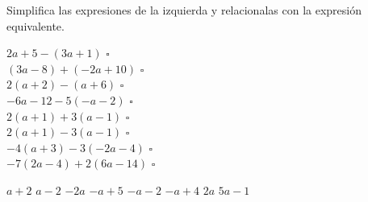 Simplifica las expresiones de la izquierda y relacionalas con la expresión equivalente.
\begin{multicols}{2}
    \begin{flushright}
        $2a+5 - (3a+1)$ $\square$\\       \vspace{0.5cm}
        $(3a-8)+(-2a+10)$ $\square$\\       \vspace{0.5cm}
        $2(a+2)-(a+6)$ $\square$\\       \vspace{0.5cm}
        $-6a-12-5(-a-2)$ $\square$\\       \vspace{0.5cm}
        $2(a+1)+3(a-1)$ $\square$\\       \vspace{0.5cm}
        $2(a+1)-3(a-1)$ $\square$\\       \vspace{0.5cm}
        $-4(a+3)-3(-2a-4)$ $\square$\\       \vspace{0.5cm}
        $-7(2a-4)+2(6a-14)$ $\square$\\       \vspace{0.5cm}
    \end{flushright}
    \vspace{1cm}
    \begin{checkboxes}
        \choice $a+2$
        \choice $a-2$
        \choice $-2a$
        \choice $-a+5$
        \choice $-a-2$
        \choice $-a+4$
        \choice $2a$
        \choice $5a-1$
    \end{checkboxes}
\end{multicols}
